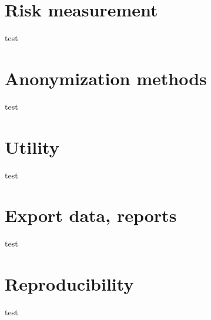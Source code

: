 \documentclass[letterpaper,10pt,english]{sphinxmanual}
\begin{document}
\chapter{Risk measurement}
\label{\detokenize{risk::doc}}\label{\detokenize{risk:risk-measurement}}
test


\chapter{Anonymization methods}
\label{\detokenize{anon::doc}}\label{\detokenize{anon:anonymization-methods}}
test


\chapter{Utility}
\label{\detokenize{utility:utility}}\label{\detokenize{utility::doc}}
test


\chapter{Export data, reports}
\label{\detokenize{export::doc}}\label{\detokenize{export:export-data-reports}}
test


\chapter{Reproducibility}
\label{\detokenize{reproducibility:reproducibility}}\label{\detokenize{reproducibility::doc}}
test



\renewcommand{\indexname}{Index}
\printindex
\end{document}

